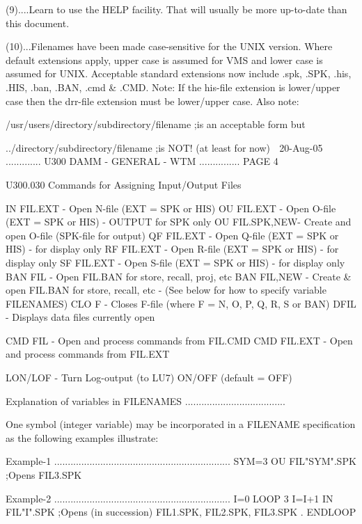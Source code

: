    (9)....Learn  to  use  the  HELP  facility.  That  will  usually  be   more
          up-to-date than this document.
 
   (10)...Filenames  have been made case-sensitive for the UNIX version. Where
          default extensions apply, upper case is assumed for  VMS  and  lower
          case  is  assumed  for  UNIX.  Acceptable  standard  extensions  now
          include .spk, .SPK, .his, .HIS, .ban, .BAN, .cmd &  .CMD.  Note:  If
          the  his-file  extension  is  lower/upper  case  then  the  drr-file
          extension must be lower/upper case. Also note:
 
   /usr/users/directory/subdirectory/filename   ;is an acceptable form but
 
           ../directory/subdirectory/filename   ;is NOT! (at least for now)
    
   20-Aug-05 ............. U300  DAMM - GENERAL - WTM ............... PAGE   4
 
   U300.030  Commands for Assigning Input/Output Files
 
   IN   FIL.EXT    - Open N-file (EXT = SPK or HIS)
   OU   FIL.EXT    - Open O-file (EXT = SPK or HIS) - OUTPUT for SPK only
   OU   FIL.SPK,NEW- Create and open O-file (SPK-file for output)
   QF   FIL.EXT    - Open Q-file (EXT = SPK or HIS) - for display only
   RF   FIL.EXT    - Open R-file (EXT = SPK or HIS) - for display only
   SF   FIL.EXT    - Open S-file (EXT = SPK or HIS) - for display only
   BAN  FIL        - Open FIL.BAN for store, recall, proj, etc
   BAN  FIL,NEW    - Create & open FIL.BAN for store, recall, etc
                   - (See below for how to specify variable FILENAMES)
   CLO  F          - Closes F-file (where F = N, O, P, Q, R, S or BAN)
   DFIL            - Displays data files currently open
 
   CMD  FIL        - Open and process commands from FIL.CMD
   CMD  FIL.EXT    - Open and process commands from FIL.EXT
 
   LON/LOF         - Turn Log-output (to LU7) ON/OFF (default = OFF)
 
   Explanation of variables in FILENAMES .....................................
 
   One   symbol   (integer   variable)  may  be  incorporated  in  a  FILENAME
   specification as the following examples illustrate:
 
   Example-1 .................................................................
   SYM=3
   OU FIL"SYM".SPK  ;Opens FIL3.SPK
 
   Example-2 .................................................................
   I=0
   LOOP 3
   I=I+1
   IN FIL"I".SPK    ;Opens (in succession) FIL1.SPK, FIL2.SPK, FIL3.SPK
   .
   ENDLOOP
 
